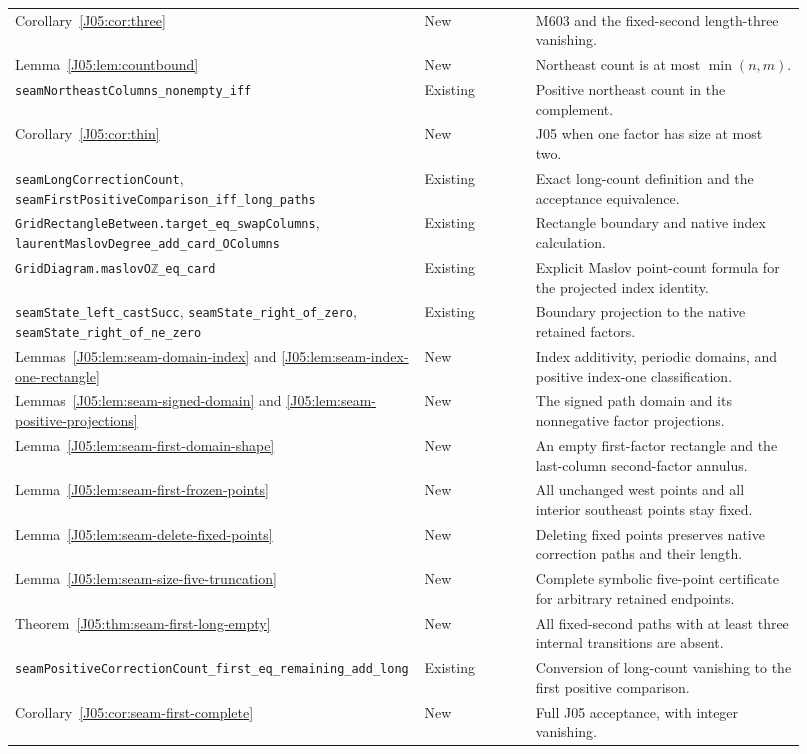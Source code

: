 \documentclass[11pt,oneside]{report}
\theoremstyle{definition}
\numberwithin{equation}{section}
\newcommand{\decl}[1]{\textnormal{\nolinkurl{#1}}}
\begin{document}
\begin{longtable}{>{\raggedright\arraybackslash}p{0.44\linewidth}
                  >{\raggedright\arraybackslash}p{0.14\linewidth}
                  >{\raggedright\arraybackslash}p{0.34\linewidth}}
Corollary~\ref{J05:cor:three}
& New & M603 and the fixed-second length-three vanishing.\\
Lemma~\ref{J05:lem:countbound}
& New & Northeast count is at most $\min(n,m)$.\\
\decl{seamNortheastColumns_nonempty_iff}
& Existing & Positive northeast count in the complement.\\
Corollary~\ref{J05:cor:thin}
& New & J05 when one factor has size at most two.\\
\decl{seamLongCorrectionCount},
\decl{seamFirstPositiveComparison_iff_long_paths}
& Existing & Exact long-count definition and the acceptance equivalence.\\
\decl{GridRectangleBetween.target_eq_swapColumns},
\decl{laurentMaslovDegree_add_card_OColumns}
& Existing & Rectangle boundary and native index calculation.\\
\decl{GridDiagram.maslovOℤ_eq_card}
& Existing & Explicit Maslov point-count formula for the projected index identity.\\
\decl{seamState_left_castSucc}, \decl{seamState_right_of_zero},
\decl{seamState_right_of_ne_zero}
& Existing & Boundary projection to the native retained factors.\\
Lemmas~\ref{J05:lem:seam-domain-index} and
\ref{J05:lem:seam-index-one-rectangle}
& New & Index additivity, periodic domains, and positive index-one classification.\\
Lemmas~\ref{J05:lem:seam-signed-domain} and
\ref{J05:lem:seam-positive-projections}
& New & The signed path domain and its nonnegative factor projections.\\
Lemma~\ref{J05:lem:seam-first-domain-shape}
& New & An empty first-factor rectangle and the last-column second-factor annulus.\\
Lemma~\ref{J05:lem:seam-first-frozen-points}
& New & All unchanged west points and all interior southeast points stay fixed.\\
Lemma~\ref{J05:lem:seam-delete-fixed-points}
& New & Deleting fixed points preserves native correction paths and their length.\\
Lemma~\ref{J05:lem:seam-size-five-truncation}
& New & Complete symbolic five-point certificate for arbitrary retained endpoints.\\
Theorem~\ref{J05:thm:seam-first-long-empty}
& New & All fixed-second paths with at least three internal transitions are absent.\\
\decl{seamPositiveCorrectionCount_first_eq_remaining_add_long}
& Existing & Conversion of long-count vanishing to the first positive comparison.\\
Corollary~\ref{J05:cor:seam-first-complete}
& New & Full J05 acceptance, with integer vanishing.\\
\end{longtable}
\normalsize
\end{document}
